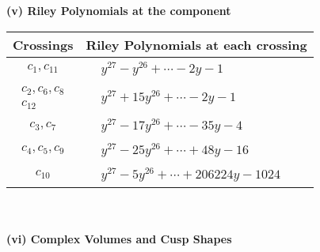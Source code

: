 \documentclass[1p]{elsarticle_modified}
\theoremstyle{definition}
\begin{document}
\newpage\renewcommand{\arraystretch}{1}
\flushleft \textbf{(v) Riley Polynomials at the component}\newline \\
\begin{tabular}{m{50pt}|m{274pt}}
Crossings & \hspace{64pt}Riley Polynomials at each crossing \\
\hline $$\begin{aligned}c_{1},c_{11}\end{aligned}$$&$\begin{aligned}
&y^{27}- y^{26}+\cdots-2 y-1
\end{aligned}$\\
\hline $$\begin{aligned}c_{2},c_{6},c_{8}\\c_{12}\end{aligned}$$&$\begin{aligned}
&y^{27}+15 y^{26}+\cdots-2 y-1
\end{aligned}$\\
\hline $$\begin{aligned}c_{3},c_{7}\end{aligned}$$&$\begin{aligned}
&y^{27}-17 y^{26}+\cdots-35 y-4
\end{aligned}$\\
\hline $$\begin{aligned}c_{4},c_{5},c_{9}\end{aligned}$$&$\begin{aligned}
&y^{27}-25 y^{26}+\cdots+48 y-16
\end{aligned}$\\
\hline $$\begin{aligned}c_{10}\end{aligned}$$&$\begin{aligned}
&y^{27}-5 y^{26}+\cdots+206224 y-1024
\end{aligned}$\\
\hline
\end{tabular}\\~\\
\newpage\flushleft \textbf{(vi) Complex Volumes and Cusp Shapes}
\end{document}
